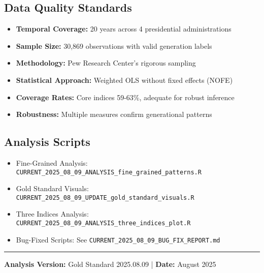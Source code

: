 \documentclass[11pt,letterpaper]{article}
\newcommand{\compactdesc}[2]{\item \textbf{#1:} #2}
\begin{document}
\subsection{Data Quality Standards}
\begin{itemize}
    \compactdesc{Temporal Coverage}{20 years across 4 presidential administrations}
    \compactdesc{Sample Size}{30,869 observations with valid generation labels}
    \compactdesc{Methodology}{Pew Research Center's rigorous sampling}
    \compactdesc{Statistical Approach}{Weighted OLS without fixed effects (NOFE)}
    \compactdesc{Coverage Rates}{Core indices 59-63\%, adequate for robust inference}
    \compactdesc{Robustness}{Multiple measures confirm generational patterns}
\end{itemize}

\subsection{Analysis Scripts}
\begin{itemize}
    \item Fine-Grained Analysis: \texttt{CURRENT\_2025\_08\_09\_ANALYSIS\_fine\_grained\_patterns.R}
    \item Gold Standard Visuals: \texttt{CURRENT\_2025\_08\_09\_UPDATE\_gold\_standard\_visuals.R}
    \item Three Indices Analysis: \texttt{CURRENT\_2025\_08\_09\_ANALYSIS\_three\_indices\_plot.R}
    \item Bug-Fixed Scripts: See \texttt{CURRENT\_2025\_08\_09\_BUG\_FIX\_REPORT.md}
\end{itemize}

\vspace{1em}
\noindent\rule{\textwidth}{0.2pt}

\begin{center}
\textbf{Analysis Version:} Gold Standard 2025.08.09 | \textbf{Date:} August 2025
\end{center}
\end{document}

